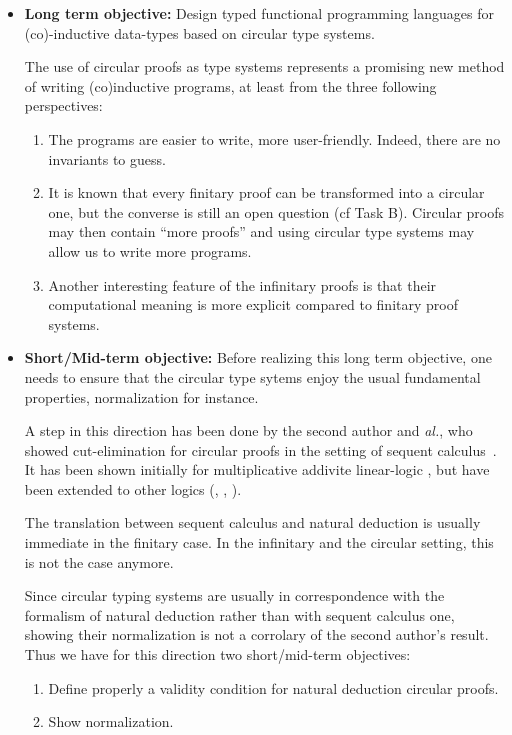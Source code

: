 \begin{itemize}
\item \textbf{Long term objective:} Design typed functional programming languages for (co)-inductive data-types based on circular type systems.

  \bigskip
The use of circular proofs as type systems represents a promising new
method of writing (co)inductive programs, at least from the three following perspectives:

\begin{enumerate}
\item The programs are easier to write, more user-friendly. Indeed, there are no invariants to guess.
\item It is known that every finitary proof can be transformed into a circular one, but the converse is still an open question (cf Task B).
Circular proofs may then contain ``more proofs'' and using circular type systems may allow us to write more programs.
  \item Another interesting feature of the infinitary proofs is that their computational meaning is more explicit compared to finitary proof systems.
\end{enumerate}


\item \textbf{Short/Mid-term objective:} Before realizing this long term objective, one needs to ensure that the circular type sytems
  enjoy the usual fundamental properties, normalization for instance.

  A step in this direction has been done by the second author and \textit{al.},  who showed cut-elimination for circular proofs in the setting of sequent calculus~\citebiblio{}. It has been shown initially for multiplicative addivite linear-logic \MALL, but have been extended to other logics (\LL, \LK, \LJ).


  The translation between sequent calculus and
natural deduction is usually immediate in the finitary case. In the infinitary and the circular
setting, this is not the case anymore.


 Since circular typing systems  are usually in correspondence with the
formalism of natural deduction rather than with sequent calculus one,
showing their normalization is not a corrolary of the second author's result.
Thus we have for this direction two short/mid-term objectives:
  \begin{enumerate}
  \item Define properly  a validity condition for natural deduction circular proofs.
    \item Show normalization.
    \end{enumerate}

  \end{itemize}

